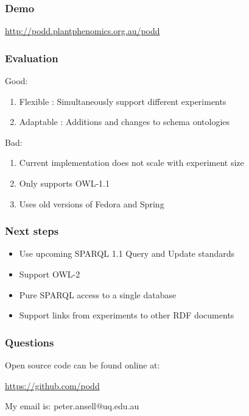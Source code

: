 \documentclass[12pt]{beamer}
\begin{document}
\bgroup
{}
\begin{frame}[plain]{}
\end{frame}
\egroup

\begin{frame}
\frametitle{Demo} 

\url{http://podd.plantphenomics.org.au/podd}

\end{frame}

\begin{frame}
\frametitle{Evaluation}

Good:

\begin{enumerate}
 \item Flexible : Simultaneously support different experiments
 \item Adaptable : Additions and changes to schema ontologies
\end{enumerate}

Bad:

\begin{enumerate}
 \item Current implementation does not scale with experiment size
 \item Only supports OWL-1.1
 \item Uses old versions of Fedora and Spring
\end{enumerate}


\end{frame}

\begin{frame}
\frametitle{Next steps}

\begin{itemize}
 \item Use upcoming SPARQL 1.1 Query and Update standards
 \item Support OWL-2
 \item Pure SPARQL access to a single database
 \item Support links from experiments to other RDF documents
\end{itemize}


\end{frame}


\begin{frame}
\frametitle{Questions}

\begin{center}
Open source code can be found online at:

\url{https://github.com/podd}

\vskip 12pt

My email is: peter.ansell@uq.edu.au
\end{center}
\end{frame}
\end{document}
